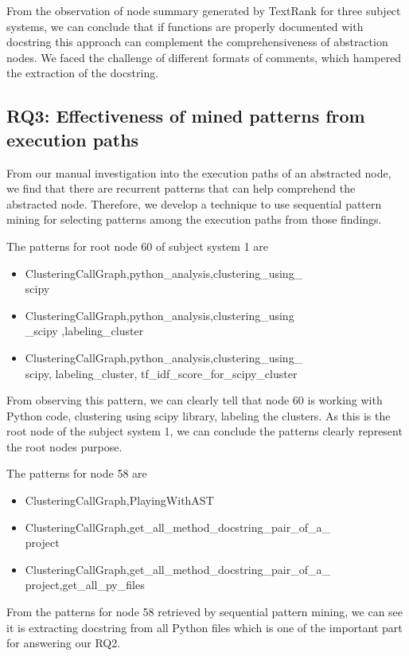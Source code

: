 From the observation of node summary generated by TextRank for three subject systems, we can conclude that if functions are properly documented with docstring this approach can complement the comprehensiveness of abstraction nodes. We faced the challenge of different formats of comments, which hampered the extraction of the docstring. 

\subsection{ RQ3: Effectiveness of mined patterns from execution paths}
From our manual investigation into the execution paths of an abstracted node, we find that there are recurrent patterns that can help comprehend the abstracted node. Therefore, we develop a technique to use sequential pattern mining for selecting patterns among the execution paths from those findings. 

The patterns for root node 60 of subject system 1 are

\begin{itemize}
    \item ClusteringCallGraph,python\_analysis,clustering\_using\_\\
    scipy
    \item ClusteringCallGraph,python\_analysis,clustering\_using\\
    \_scipy ,labeling\_cluster
    \item ClusteringCallGraph,python\_analysis,clustering\_using\_\\scipy,
labeling\_cluster, tf\_idf\_score\_for\_scipy\_cluster
\end{itemize}
From observing this pattern, we can clearly tell that node 60 is working with Python code, clustering using scipy library, labeling the clusters. As this is the root node of the subject system 1, we can conclude the patterns clearly represent the root nodes purpose.

The patterns for node 58 are 

\begin{itemize}
    \item ClusteringCallGraph,PlayingWithAST
    \item ClusteringCallGraph,get\_all\_method\_docstring\_pair\_of\_a\_\\
    project
    \item ClusteringCallGraph,get\_all\_method\_docstring\_pair\_of\_a\_\\
    project,get\_all\_py\_files
\end{itemize}
From the patterns for node 58 retrieved by sequential pattern mining, we can see it is extracting docstring from all Python files which is one of the important part for answering our RQ2. 

